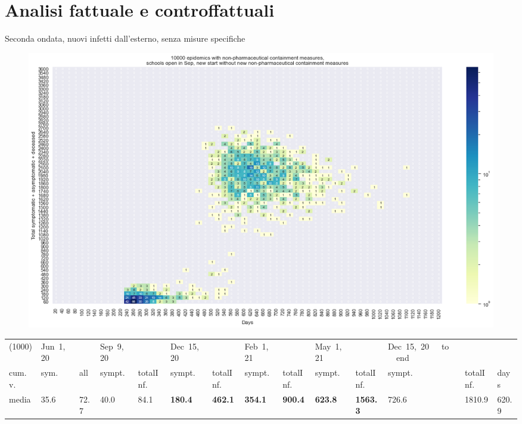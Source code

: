 \documentclass[]{beamer}
\begin{document}
\section{Analisi fattuale e controffattuali}

\begin{frame}{Seconda ondata, nuovi infetti dall'esterno, senza misure specifiche}


\begin{figure}[H]
\center
\includegraphics[scale=0.22]{10kForceWave2.png}
\label{selForceWave2}
\end{figure}


\begin{table}[H]
\center
\tiny
\begin{tabular}{p{0.4cm}p{0.3cm}p{0.3cm}p{0.3cm}p{0.3cm}p{0.3cm}p{0.3cm}p{0.3cm}p{0.3cm}p{0.3cm}p{0.3cm}p{0.3cm}p{0.3cm}p{0.4cm}}
\toprule
(1000) &  Jun~1,~20 & &  Sep~9,~20 & & Dec~15,~20 & & Feb~1,~21 & & May~1,~21 & & Dec~15,~20~~~to~~~end   \\
cum.~v. &  sym. &  all &  sympt. &  totalInf. &  sympt. &  totalInf. &  sympt. &  totalInf. &  sympt. &  totalInf. &  sympt. &  totalInf.  & days\\
\midrule
media  &     35.6 &                       72.7 &     40.0 &                       84.1 &    \textbf{180.4} &                      \textbf{462.1} &    \textbf{354.1} &                      \textbf{900.4} &    \textbf{623.8} &                     \textbf{1563.3} &               726.6 &                  1810.9 &  620.9 \\
\bottomrule
\end{tabular}

\label{selForceWave2Tab}
\end{table}


\end{frame}
\end{document}
